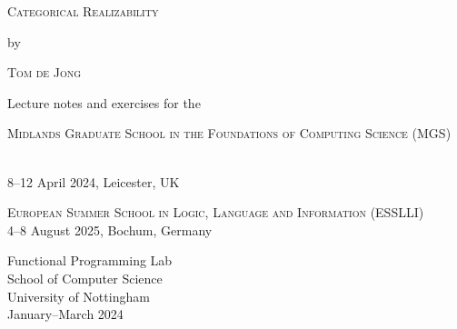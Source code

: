 \begin{titlepage}
\begin{center}

  \large %

  {\Huge\textsc{Categorical Realizability}\par}


  by


  {\huge\textsc{Tom de Jong}}


  {\Large{Lecture notes and exercises for the

      \textsc{Midlands Graduate School in the
Foundations of Computing Science (MGS)}}} \\
  8--12 April 2024, Leicester, UK

  {\Large{\textsc{European Summer School in Logic, Language and Information (ESSLLI)}}} \\
    4--8 August 2025, Bochum, Germany



  \makeicon

  \vfill

  \flushright
  {\normalsize{Functional Programming Lab\\
      School of Computer Science \\
      University of Nottingham \\
      January--March 2024}}

\end{center}
\end{titlepage}

